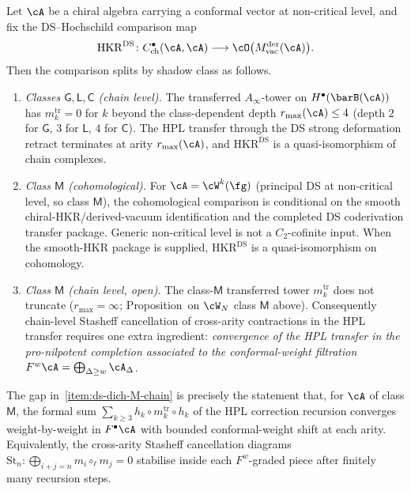 \begin{proposition}%
\label{prop:ds-hochschild-class-dichotomy}%
%
%
Let $\cA$ be a chiral algebra carrying a conformal vector at
non-critical level, and fix the DS--Hochschild comparison map
\[
\mathrm{HKR}^{\mathrm{DS}}\colon
C^\bullet_{\mathrm{ch}}(\cA,\cA)\longrightarrow
\cO\bigl(M_{\mathrm{vac}}^{\mathrm{der}}(\cA)\bigr).
\]
Then the comparison splits by shadow class as follows.
\begin{enumerate}[label=\textup{(\roman*)}]
\item\label{item:ds-dich-GLC} \emph{Classes $\mathsf{G},\mathsf{L},\mathsf{C}$
 (chain level).} The transferred $A_\infty$-tower on
 $H^\bullet(\barB(\cA))$ has $m_k^{\mathrm{tr}}=0$ for $k$ beyond the
 class-dependent depth $r_{\max}(\cA)\le 4$ (depth $2$ for $\mathsf{G}$,
 $3$ for $\mathsf{L}$, $4$ for $\mathsf{C}$). The HPL transfer through
 the DS strong deformation retract terminates at arity $r_{\max}(\cA)$,
 and $\mathrm{HKR}^{\mathrm{DS}}$ is a quasi-isomorphism of chain
 complexes.
\item\label{item:ds-dich-M-coh} \emph{Class $\mathsf{M}$ (cohomological).}
 For $\cA=\cW^k(\fg)$ (principal DS at non-critical level, so class
 $\mathsf{M}$), the cohomological comparison is conditional on the
 smooth chiral-HKR/derived-vacuum identification and the completed
 DS coderivation transfer package.  Generic non-critical level is not
 a $C_2$-cofinite input.  When the smooth-HKR package is supplied,
 $\mathrm{HKR}^{\mathrm{DS}}$ is a quasi-isomorphism on cohomology.
\item\label{item:ds-dich-M-chain} \emph{Class $\mathsf{M}$ (chain level, open).}
 The class-$\mathsf{M}$ transferred tower $m_k^{\mathrm{tr}}$ does not
 truncate ($r_{\max}=\infty$; Proposition~on $\cW_N$ class $\mathsf M$
 above). Consequently chain-level Stasheff cancellation of cross-arity
 contractions in the HPL transfer requires one extra ingredient:
 \emph{convergence of the HPL transfer in the pro-nilpotent completion
 associated to the conformal-weight filtration}
 $F^w\cA=\bigoplus_{\Delta\ge w}\cA_\Delta$.
\end{enumerate}
The gap in~\ref{item:ds-dich-M-chain} is precisely the statement that,
for $\cA$ of class $\mathsf{M}$, the formal sum
$\sum_{k\ge 3} h_k\circ m_k^{\mathrm{tr}}\circ h_k$ of the HPL
correction recursion converges weight-by-weight in $F^\bullet\cA$ with
bounded conformal-weight shift at each arity. Equivalently, the
cross-arity Stasheff cancellation diagrams
$\mathrm{St}_n\colon \bigoplus_{i+j=n}m_i\circ_\ell m_j=0$ stabilise
inside each $F^w$-graded piece after finitely many recursion steps.
\end{proposition}

